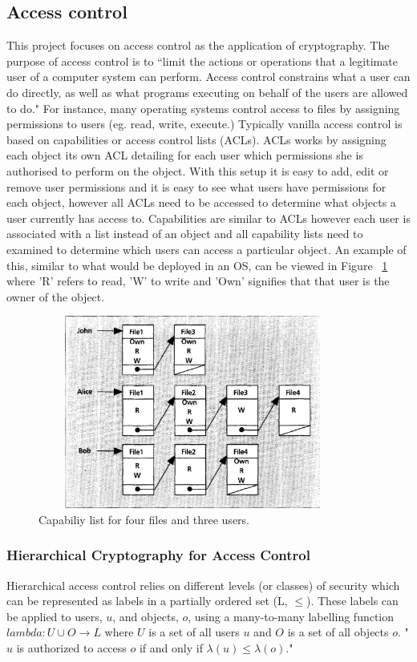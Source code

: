 \documentclass[12pt, titlepage]{article}
\begin{document}
\subsection*{Access control}
This project focuses on access control as the application of cryptography. The purpose of access control is to ``limit the actions or operations that a legitimate user of a computer system can perform. Access control constrains what a user can do directly, as well as what programs executing on behalf of the users are allowed to do."\cite{accessControlPrinciples} For instance, many operating systems control access to files by assigning permissions to users (eg. read, write, execute.) Typically vanilla access control is based on capabilities or access control lists (ACLs). ACLs works by assigning each object its own ACL detailing for each user which permissions she is authorised to perform on the object. With this setup it is easy to add, edit or remove user permissions and it is easy to see what users have permissions for each object, however all ACLs need to be accessed to determine what objects a user currently has access to. Capabilities are similar to ACLs however each user is associated with a list instead of an object and all capability lists need to examined to determine which users can access a particular object. An example of this, similar to what would be deployed in an OS, can be viewed in Figure ~\ref{fig:capabilities} where 'R' refers to read, 'W' to write and 'Own' signifies that that user is the owner of the object.

\begin{figure}
\centerline{\includegraphics[height=2.5in,width=4in,angle=0]{capabilities.pdf}}
\caption{Capabiliy list for four files and three users.\cite{accessControlPrinciples}}
\label{fig:capabilities}
\end{figure}

\subsubsection{Hierarchical Cryptography for Access Control}
Hierarchical access control relies on different levels (or classes) of security which can be represented as labels in a partially ordered set (L, $≤$). These labels can be applied to users, $u$, and objects, $o$, using a many-to-many labelling function $lambda : U ∪ O → L$ where $U$ is a set of all users $u$ and $O$ is a set of all objects $o$. "$u$ is authorized to access $o$ if and only if $\lambda(u)≤\lambda(o)$\cite{mainPaper}."
\end{document}
